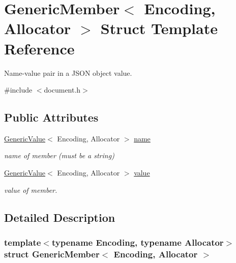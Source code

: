 \hypertarget{struct_generic_member}{}\section{Generic\+Member$<$ Encoding, Allocator $>$ Struct Template Reference}
\label{struct_generic_member}


Name-\/value pair in a J\+S\+ON object value.  




{\ttfamily \#include $<$document.\+h$>$}

\subsection*{Public Attributes}
\begin{DoxyCompactItemize}
\item 
\mbox{\label{struct_generic_member_a7124f7ccd67421533d33139938604fac}} 
\hyperlink{class_generic_value}{Generic\+Value}$<$ Encoding, Allocator $>$ \hyperlink{struct_generic_member_a7124f7ccd67421533d33139938604fac}{name}
\begin{DoxyCompactList}\small\item\em name of member (must be a string) \end{DoxyCompactList}\item 
\mbox{\label{struct_generic_member_aad3cfa4f9e8b9018068c8bc865723083}} 
\hyperlink{class_generic_value}{Generic\+Value}$<$ Encoding, Allocator $>$ \hyperlink{struct_generic_member_aad3cfa4f9e8b9018068c8bc865723083}{value}
\begin{DoxyCompactList}\small\item\em value of member. \end{DoxyCompactList}\end{DoxyCompactItemize}


\subsection{Detailed Description}
\subsubsection*{template$<$typename Encoding, typename Allocator$>$\newline
struct Generic\+Member$<$ Encoding, Allocator $>$}

